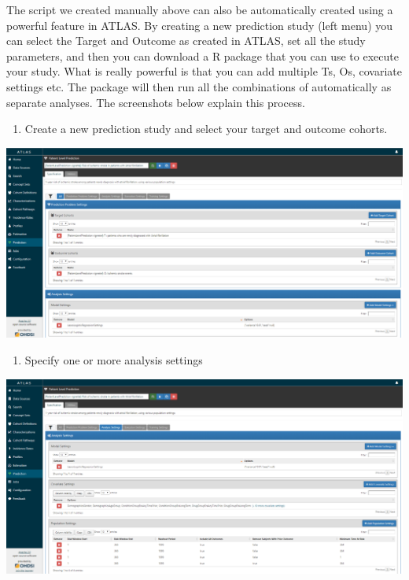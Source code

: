 \documentclass[]{book}
\providecommand{\tightlist}{%
  \setlength{\itemsep}{0pt}\setlength{\parskip}{0pt}}
\begin{document}
The script we created manually above can also be automatically created
using a powerful feature in ATLAS. By creating a new prediction study
(left menu) you can select the Target and Outcome as created in ATLAS,
set all the study parameters, and then you can download a R package that
you can use to execute your study. What is really powerful is that you
can add multiple Ts, Os, covariate settings etc. The package will then
run all the combinations of automatically as separate analyses. The
screenshots below explain this process.

\begin{enumerate}
\def\labelenumi{\arabic{enumi}.}
\tightlist
\item
  Create a new prediction study and select your target and outcome
  cohorts.
\end{enumerate}

\includegraphics[width=1\linewidth]{images/PatientLevelPrediction/atlasplp1}

\begin{enumerate}
\def\labelenumi{\arabic{enumi}.}
\setcounter{enumi}{1}
\tightlist
\item
  Specify one or more analysis settings
\end{enumerate}

\includegraphics[width=1\linewidth]{images/PatientLevelPrediction/atlasplp2}
\end{document}
